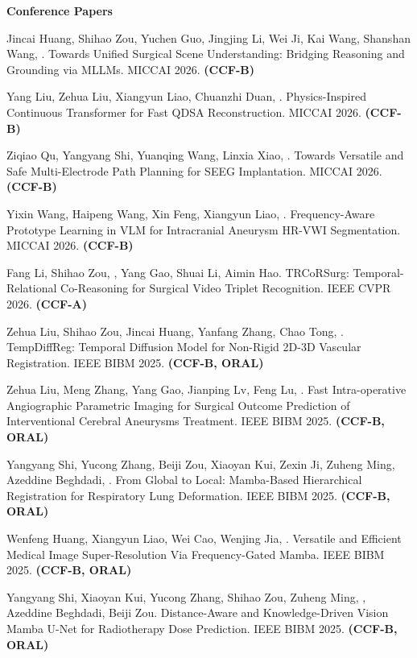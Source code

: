 \documentclass[a4paper,12pt,english]{curve}
\begin{document}
{\large\bfseries\sffamily Conference Papers}\par
\vspace{2pt}
\begin{small}
\setcounter{pubitem}{0}
\begin{publist}
\item Jincai Huang, Shihao Zou, Yuchen Guo, Jingjing Li, Wei Ji, Kai Wang, Shanshan Wang, \WS\CORR. Towards Unified Surgical Scene Understanding: Bridging Reasoning and Grounding via MLLMs. MICCAI 2026. \textbf{(CCF-B)}
\item Yang Liu, Zehua Liu, Xiangyun Liao, Chuanzhi Duan, \WS\CORR. Physics-Inspired Continuous Transformer for Fast QDSA Reconstruction. MICCAI 2026. \textbf{(CCF-B)}
\item Ziqiao Qu, Yangyang Shi, Yuanqing Wang, Linxia Xiao, \WS\CORR. Towards Versatile and Safe Multi-Electrode Path Planning for SEEG Implantation. MICCAI 2026. \textbf{(CCF-B)}
\item Yixin Wang, Haipeng Wang, Xin Feng, Xiangyun Liao, \WS\CORR. Frequency-Aware Prototype Learning in VLM for Intracranial Aneurysm HR-VWI Segmentation. MICCAI 2026. \textbf{(CCF-B)}
\item Fang Li\COF, Shihao Zou\COF, \WS\CORR, Yang Gao\CORR, Shuai Li, Aimin Hao. TRCoRSurg: Temporal-Relational Co-Reasoning for Surgical Video Triplet Recognition. IEEE CVPR 2026. \textbf{(CCF-A)}
\item Zehua Liu, Shihao Zou, Jincai Huang, Yanfang Zhang, Chao Tong, \WS\CORR. TempDiffReg: Temporal Diffusion Model for Non-Rigid 2D-3D Vascular Registration. IEEE BIBM 2025. \textbf{(CCF-B, ORAL)}
\item Zehua Liu, Meng Zhang, Yang Gao, Jianping Lv, Feng Lu, \WS\CORR. Fast Intra-operative Angiographic Parametric Imaging for Surgical Outcome Prediction of Interventional Cerebral Aneurysms Treatment. IEEE BIBM 2025. \textbf{(CCF-B, ORAL)}
\item Yangyang Shi, Yucong Zhang, Beiji Zou, Xiaoyan Kui, Zexin Ji, Zuheng Ming, Azeddine Beghdadi, \WS\CORR. From Global to Local: Mamba-Based Hierarchical Registration for Respiratory Lung Deformation. IEEE BIBM 2025. \textbf{(CCF-B, ORAL)}
\item Wenfeng Huang, Xiangyun Liao, Wei Cao, Wenjing Jia, \WS\CORR. Versatile and Efficient Medical Image Super-Resolution Via Frequency-Gated Mamba. IEEE BIBM 2025. \textbf{(CCF-B, ORAL)}
\item Yangyang Shi, Xiaoyan Kui, Yucong Zhang, Shihao Zou, Zuheng Ming, \WS\CORR, Azeddine Beghdadi, Beiji Zou. Distance-Aware and Knowledge-Driven Vision Mamba U-Net for Radiotherapy Dose Prediction. IEEE BIBM 2025. \textbf{(CCF-B, ORAL)}

\end{publist}
\end{small}
\end{document}

